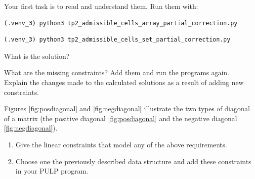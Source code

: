 \documentclass[a4paper, 12pt]{article}
\begin{document}
\begin{question}
  Your first task is to read and understand them.
  Run them with: 
\begin{verbatim}
(.venv_3) python3 tp2_admissible_cells_array_partial_correction.py 
\end{verbatim}

\begin{verbatim}
(.venv_3) python3 tp2_admissible_cells_set_partial_correction.py 
\end{verbatim}
    
\noindent What is the solution?
\end{question}
\begin{question}
  What are the missing constraints? Add them and run the programs again. Explain the changes made to the calculated solutions as a result of adding new constraints.  
\end{question}

\begin{question} 
  Figures \ref{fig:posdiagonal} and \ref{fig:negdiagonal} illustrate the two types of diagonal of a matrix (the positive diagonal \ref{fig:posdiagonal} and the negative diagonal \ref{fig:negdiagonal}). 

  \begin{enumerate}
    \item  Give the linear constraints that model any of the above requirements. 
    \item Choose one the previously described data structure and add these constraints in your PULP program. 
  \end{enumerate}


\end{question}
\end{document}

